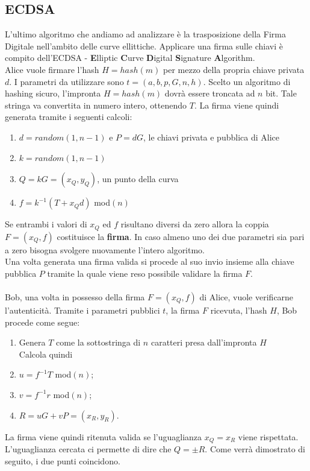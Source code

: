 \documentclass[a4paper,12pt]{tesiinfo}
\begin{document}
\subsection{ECDSA}
L'ultimo algoritmo che andiamo ad analizzare \`e la trasposizione della Firma Digitale nell'ambito delle curve ellittiche. Applicare una firma sulle chiavi \`e compito dell'ECDSA - \textbf{E}lliptic \textbf{C}urve \textbf{D}igital \textbf{S}ignature \textbf{A}lgorithm.
\\
Alice vuole firmare l'hash $H=hash(m)$ per mezzo della propria chiave privata $d$. I parametri da utilizzare sono $t = (a, b, p, G, n, h)$.
Scelto un algoritmo di hashing sicuro, l'impronta $H = hash(m)$ dovr\`a essere troncata ad $n$ bit. Tale stringa va convertita in numero intero, ottenendo $T$. La firma viene quindi generata tramite i seguenti calcoli:
\begin{enumerate}
 \item $d = random(1, n-1)$ e $P =dG$, le chiavi privata e pubblica di Alice 
 \item $k = random(1, n-1)$
 \item $Q = kG= (x_Q, y_Q) $, un punto della curva
 \item $f = k^{-1} (T+x_Qd) $ mod$(n)$
\end{enumerate}
Se entrambi i valori di $x_Q$ ed $f$ risultano diversi da zero allora la coppia $F = (x_Q, f)$ costituisce la \textbf{firma}. In caso almeno uno dei due parametri sia pari a zero bisogna svolgere nuovamente l'intero algoritmo.
\\
Una volta generata una firma valida si procede al suo invio insieme alla chiave pubblica $P$ tramite la quale viene reso possibile validare la firma $F$.
\\
\\
Bob, una volta in possesso della firma $F = (x_Q, f)$ di Alice, vuole verificarne l'autenticit\`a. Tramite i parametri pubblici $t$, la firma $F$ ricevuta, l'hash $H$, Bob procede come segue:
\begin{enumerate}
 \item Genera $T$ come la sottostringa di $n$ caratteri presa dall'impronta $H$
 \\
 Calcola quindi
 \item $u = f^{-1}T$ mod$(n)$;
 \item $v = f^{-1}r$ mod$(n)$;
 \item $R = uG + vP = (x_R, y_R)$.
\end{enumerate}
La firma viene quindi ritenuta valida se l'uguaglianza $x_Q = x_R $ viene rispettata. L'uguaglianza cercata ci permette di dire che $Q = \pm R$. Come verr\`a dimostrato di seguito, i due punti coincidono.
\end{document}
